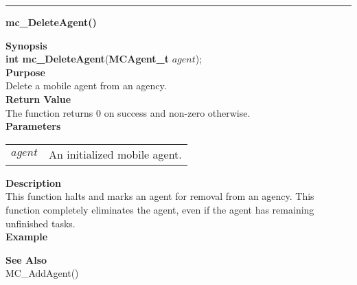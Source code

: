 \noindent
\vspace{5pt}
\rule{6.5in}{0.015in}
\noindent
{}
{\LARGE \bf mc\_DeleteAgent()}\\
\label{api:mc_DeleteAgent()}

\noindent
{\bf Synopsis}\\
{\bf int mc\_DeleteAgent}({\bf MCAgent\_t} $agent$);\\

\noindent
{\bf Purpose}\\
Delete a mobile agent from an agency.\\

\noindent
{\bf Return Value}\\
The function returns 0 on success and non-zero otherwise.\\

\noindent
{\bf Parameters}
\vspace{-0.1in}
\begin{description}
\item
\begin{tabular}{p{10 mm}p{145 mm}} 
$agent$ & An initialized mobile agent.
\end{tabular}
\end{description}

\noindent
{\bf Description}\\
This function halts and marks an agent for removal from an agency. This 
function completely eliminates the agent, even if the agent has remaining
unfinished tasks. \\

\noindent
{\bf Example}\\
\noindent

\noindent
{\bf See Also}\\
MC\_AddAgent()

